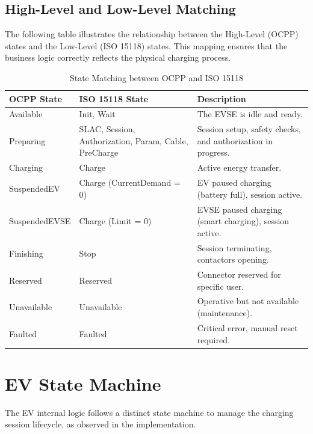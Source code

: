 \documentclass[a4paper,11pt]{report}
\begin{document}
\subsection{High-Level and Low-Level Matching}
The following table illustrates the relationship between the High-Level (OCPP) states and the Low-Level (ISO 15118) states. This mapping ensures that the business logic correctly reflects the physical charging process.

\begin{table}[H]
    \centering
    \begin{tabular}{|p{3.0cm}|p{4.5cm}|p{5.5cm}|}
    \hline
    \textbf{OCPP State} & \textbf{ISO 15118 State} & \textbf{Description} \\ \hline
    Available & Init, Wait & The EVSE is idle and ready. \\ \hline
    Preparing & SLAC, Session, Authorization, Param, Cable, PreCharge & Session setup, safety checks, and authorization in progress. \\ \hline
    Charging & Charge & Active energy transfer. \\ \hline
    SuspendedEV & Charge (CurrentDemand = 0) & EV paused charging (battery full), session active. \\ \hline
    SuspendedEVSE & Charge (Limit = 0) & EVSE paused charging (smart charging), session active. \\ \hline
    Finishing & Stop & Session terminating, contactors opening. \\ \hline
    Reserved & Reserved & Connector reserved for specific user. \\ \hline
    Unavailable & Unavailable & Operative but not available (maintenance). \\ \hline
    Faulted & Faulted & Critical error, manual reset required. \\ \hline
    \end{tabular}
    \caption{State Matching between OCPP and ISO 15118}
    \label{tab:state_matching}
\end{table}

\section{EV State Machine}
The EV internal logic follows a distinct state machine to manage the charging session lifecycle, as observed in the implementation.
\end{document}
